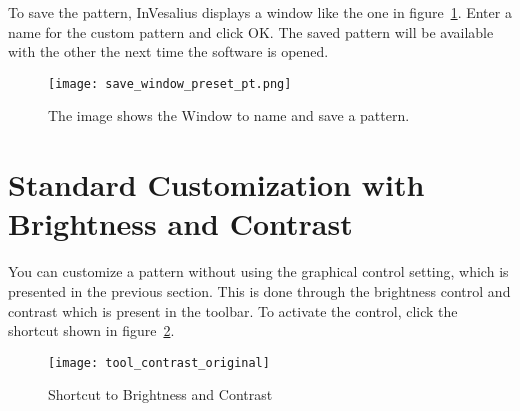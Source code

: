 
To save the pattern, InVesalius displays a window like the one in figure~\ref{fig:save_window_preset}.
Enter a name for the custom pattern and click OK. The saved pattern will be available with the other the next time the software is opened.

\begin{figure}[!htb]
\centering
\texttt{[image: save\_window\_preset\_pt.png]}
\caption{The image shows the Window to name and save a pattern.}
\label{fig:save_window_preset}
\end{figure}

\section{Standard Customization with Brightness and Contrast}


You can customize a pattern without using the graphical control setting, which is presented in the previous section. This is done through the brightness control and contrast which is present in the toolbar. To activate the control, click the shortcut shown in figure~\ref{fig:tool_contrast_original_vol}.

\begin{figure}[!htb]
\centering
\texttt{[image: tool\_contrast\_original]}
\caption{Shortcut to Brightness and Contrast}
\label{fig:tool_contrast_original_vol}
\end{figure}


